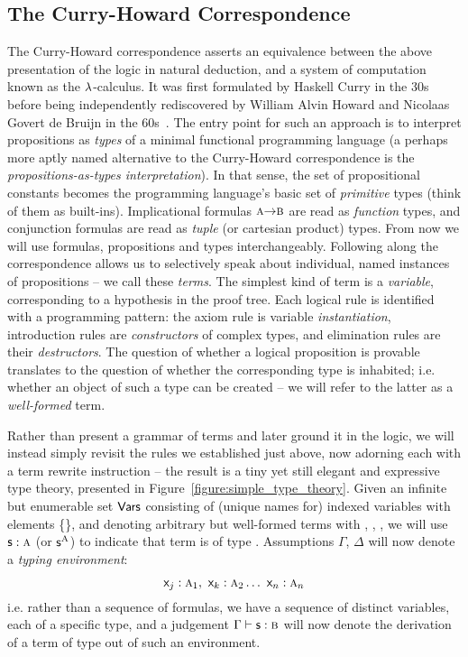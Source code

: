 \subsection{The Curry-Howard Correspondence}
The Curry-Howard correspondence asserts an equivalence between the above presentation of the logic in natural deduction, and a system of computation known as the $\mathnormal{\lambda}$-calculus.
It was first formulated by Haskell Curry in the 30s before being independently rediscovered by William Alvin Howard and Nicolaas Govert de Bruijn in the 60s~\cite{curry1934functionality,de1983automath,howard1980formulae}.
The entry point for such an approach is to interpret propositions as \textit{types} of a minimal functional programming language (a perhaps more aptly named alternative to the Curry-Howard correspondence is the \textit{propositions-as-types interpretation}).
In that sense, the set of propositional constants \propcon{} becomes the programming language's basic set of \textit{primitive} types (think of them as built-ins).
Implicational formulas $\smallprop{a} \ii \smallprop{b}$ are read as \textit{function} types, and conjunction formulas are read as \textit{tuple} (or cartesian product) types.
From now we will use formulas, propositions and types interchangeably.
Following along the correspondence allows us to selectively speak about individual, named instances of propositions -- we call these \textit{terms}.
The simplest kind of term is a \textit{variable}, corresponding to a hypothesis in the proof tree.
Each logical rule is identified with a programming pattern: the axiom rule is variable \textit{instantiation}, introduction rules are \textit{constructors} of complex types, and elimination rules are their \textit{destructors}.
The question of whether a logical proposition is provable translates to the question of whether the corresponding type is inhabited; i.e. whether an object of such a type can be created -- we will refer to the latter as a \textit{well-formed} term.

Rather than present a grammar of terms and later ground it in the logic, we will instead simply revisit the rules we established just above, now adorning each with a term rewrite instruction -- the result is a tiny yet still elegant and expressive type theory, presented in Figure~\ref{figure:simple_type_theory}.
Given an infinite but enumerable set $\mathsf{Vars}$ consisting of (unique names for) indexed variables with elements \{\term{\vari, \varj, \vark, \varl, \dots}\}, and denoting arbitrary but well-formed terms with , , , we will use $\mathsf{s}: \normalfont\textsc{a}$ (or $\mathsf{s}^{\normalfont\textsc{A}}$) to indicate that term  is of type .
Assumptions $\Gamma$, $\Delta$ will now denote a \textit{typing environment}:
\begin{equation}
\varj : \prop a_1 ,~  \vark : \prop a_2 \dots ~ \Var{n} : \prop a_n
\end{equation}
i.e. rather than a sequence of formulas, we have a sequence of distinct variables, each of a specific type, and a judgement $\Gamma \vdash \term{s} : \prop{b}$ will now denote the derivation of a term  of type  out of such an environment.


